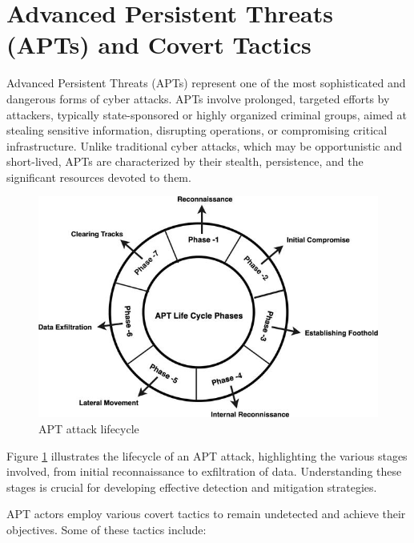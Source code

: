 \section{Advanced Persistent Threats (APTs) and Covert Tactics}

Advanced Persistent Threats (APTs) represent one of the most sophisticated and dangerous forms of cyber attacks. APTs involve prolonged, targeted efforts by attackers, typically state-sponsored or highly organized criminal groups, aimed at stealing sensitive information, disrupting operations, or compromising critical infrastructure. Unlike traditional cyber attacks, which may be opportunistic and short-lived, APTs are characterized by their stealth, persistence, and the significant resources devoted to them.

\begin{figure}
    \centering
    \includegraphics[width=\textwidth]{../Thesis_Docs/media/apt_attack_lifecycle.png}
    \caption{APT attack lifecycle \cite{charan2021dmpt}}
    \label{fig:apt_attack_lifecycle}
\end{figure}

Figure \ref{fig:apt_attack_lifecycle} illustrates the lifecycle of an APT attack, highlighting the various stages involved, from initial reconnaissance to exfiltration of data. Understanding these stages is crucial for developing effective detection and mitigation strategies.

APT actors employ various covert tactics to remain undetected and achieve their objectives. Some of these tactics include:

